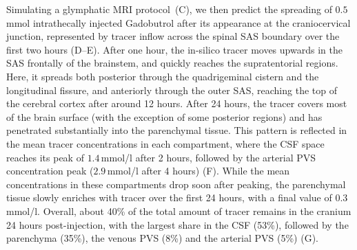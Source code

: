 \documentclass[fleqn,10pt]{wlscirep}
\begin{document}
Simulating a glymphatic MRI protocol~\cite{ringstad2017glymphatic,
ringstad2018brain, eide2024functional}(C), we then predict the spreading of $0.5$ mmol intrathecally injected Gadobutrol after its appearance at the craniocervical junction, represented by tracer inflow across the spinal SAS boundary over the first two hours (D--E). 
After one hour, the in-silico
tracer moves upwards in the SAS frontally of the brainstem, and
quickly reaches the supratentorial regions. Here, it spreads both
posterior through the quadrigeminal cistern and the longitudinal
fissure, and anteriorly through the outer SAS, reaching the top of the
cerebral cortex after around 12 hours. After 24 hours, the tracer
covers most of the brain surface (with the exception of some posterior
regions) and has penetrated substantially into the parenchymal
tissue. This pattern is reflected in the mean tracer concentrations in
each compartment, where the CSF space reaches its peak of
$1.4\,$mmol/l after 2 hours, followed by the arterial PVS
concentration peak ($2.9\,$mmol/l after 4 hours)
(F). While the mean concentrations in these
compartments drop soon after peaking, the parenchymal tissue
slowly enriches with tracer over the first 24 hours, with a final
value of $0.3$ mmol/l. Overall, about 40\% of the total amount of
tracer remains in the cranium 24 hours post-injection, with the largest
share in the CSF (53\%), followed by the parenchyma (35\%), the
venous PVS (8\%) and the arterial PVS
(5\%) (G).
\end{document}

